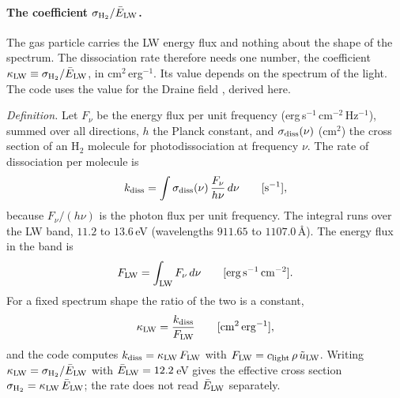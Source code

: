 \paragraph{The coefficient $\sigma_{\rm H_2}/\bar E_{\rm LW}$.}
\label{sec:isrf-lw-coefficient}
The gas particle carries the LW energy flux and nothing about the shape of the
spectrum. The dissociation rate therefore needs one number, the coefficient
$\kappa_{\rm LW}\equiv\sigma_{\rm H_2}/\bar E_{\rm LW}$, in cm$^2$\,erg$^{-1}$. Its value
depends on the spectrum of the light. The code uses the value for the Draine
field \citep{Draine1978}, derived here.

\emph{Definition.} Let $F_\nu$ be the energy flux per unit frequency
(erg\,s$^{-1}$\,cm$^{-2}$\,Hz$^{-1}$), summed over all directions, $h$ the
Planck constant, and $\sigma_{\rm diss}(\nu)$ (cm$^2$) the cross section of an
H$_2$ molecule for photodissociation at frequency $\nu$. The rate of
dissociation per molecule is
\begin{equation}
  k_{\rm diss}=\int \sigma_{\rm diss}(\nu)\,\frac{F_\nu}{h\nu}\,d\nu
  \qquad[{\rm s^{-1}}],
  \label{eq:isrf-kdiss-def}
\end{equation}
because $F_\nu/(h\nu)$ is the photon flux per unit frequency. The integral runs
over the LW band, $11.2$ to $13.6$\,eV (wavelengths $911.65$ to $1107.0$\,\AA).
The energy flux in the band is
\begin{equation}
  F_{\rm LW}=\int_{\rm LW} F_\nu\,d\nu\qquad[{\rm erg\,s^{-1}\,cm^{-2}}].
  \label{eq:isrf-FLW-def}
\end{equation}
For a fixed spectrum shape the ratio of the two is a constant,
\begin{equation}
  \kappa_{\rm LW}=\frac{k_{\rm diss}}{F_{\rm LW}}\qquad[{\rm cm^2\,erg^{-1}}],
  \label{eq:isrf-c-def}
\end{equation}
and the code computes $k_{\rm diss}=\kappa_{\rm LW}\,F_{\rm LW}$ with $F_{\rm LW}=c_{\rm
light}\,\rho\,\tilde u_{\rm LW}$. Writing $\kappa_{\rm LW}=\sigma_{\rm H_2}/\bar E_{\rm LW}$
with $\bar E_{\rm LW}=12.2$\,eV gives the effective cross section
$\sigma_{\rm H_2}=\kappa_{\rm LW}\,\bar E_{\rm LW}$; the rate does not read $\bar E_{\rm LW}$
separately.

